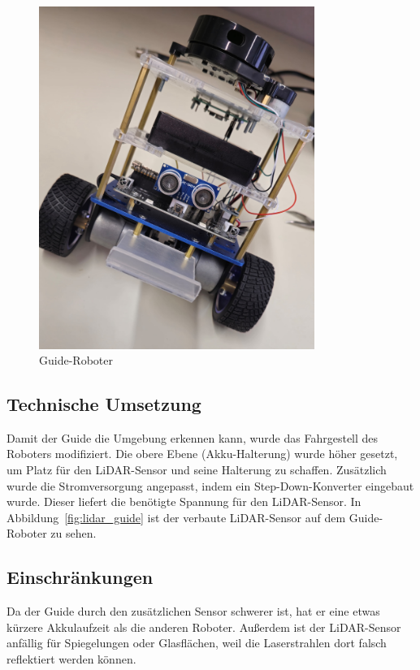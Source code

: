 \begin{figure}[H]
   \centering
   \includegraphics[width=0.8\textwidth]{img/Hardware/guide.jpg}
   \caption{Guide-Roboter}
    \label{fig:guide}
\end{figure}

\subsection{Technische Umsetzung}
Damit der Guide die Umgebung erkennen kann, wurde das Fahrgestell des Roboters modifiziert.
%
Die obere Ebene (Akku-Halterung) wurde höher gesetzt, um Platz für den LiDAR-Sensor und seine Halterung zu schaffen.
%
Zusätzlich wurde die Stromversorgung angepasst, indem ein Step-Down-Konverter eingebaut wurde.
%
Dieser liefert die benötigte Spannung für den LiDAR-Sensor.
%
In Abbildung~\ref{fig:lidar_guide} ist der verbaute LiDAR-Sensor auf dem Guide-Roboter zu sehen.

\subsection{Einschränkungen}
Da der Guide durch den zusätzlichen Sensor schwerer ist, hat er eine etwas kürzere Akkulaufzeit als die anderen Roboter.
%
Außerdem ist der LiDAR-Sensor anfällig für Spiegelungen oder Glasflächen,
weil die Laserstrahlen dort falsch reflektiert werden können.

